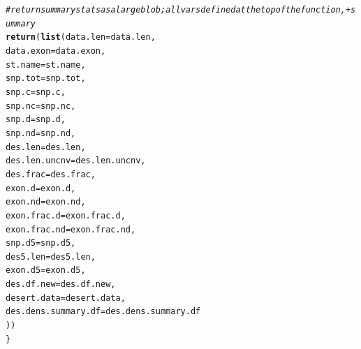 \documentclass{article}\usepackage[]{graphicx}\usepackage[]{color}
\makeatletter
\newcommand{\hlcom}[1]{\textcolor[rgb]{0.678,0.584,0.686}{\textit{#1}}}%
\newcommand{\hlstd}[1]{\textcolor[rgb]{0.345,0.345,0.345}{#1}}%
\newcommand{\hlkwc}[1]{\textcolor[rgb]{0.333,0.667,0.333}{#1}}%
\newcommand{\hlkwd}[1]{\textcolor[rgb]{0.737,0.353,0.396}{\textbf{#1}}}%
\newenvironment{kframe}{%
 \def\at@end@of@kframe{}%
 \ifinner\ifhmode%
  \def\at@end@of@kframe{\end{minipage}}%
  \begin{minipage}{\columnwidth}%
 \fi\fi%
 \def\FrameCommand##1{\hskip\@totalleftmargin \hskip-\fboxsep
 \colorbox{shadecolor}{##1}\hskip-\fboxsep
     \hskip-\linewidth \hskip-\@totalleftmargin \hskip\columnwidth}%
 \MakeFramed {\advance\hsize-\width
   \@totalleftmargin\z@ \linewidth\hsize
   \@setminipage}}%
 {\par\unskip\endMakeFramed%
 \at@end@of@kframe}
\newenvironment{knitrout}{}{} %
\makeatother
\begin{document}
\begin{knitrout}
\begin{kframe}
\begin{alltt}
  \hlcom{# return summary stats as a large blob;  all vars defined at the top of the function,  + summary}
  \hlkwd{return}\hlstd{(}\hlkwd{list}\hlstd{(}\hlkwc{data.len}\hlstd{=data.len,}
              \hlkwc{data.exon}\hlstd{=data.exon,}
              \hlkwc{st.name}\hlstd{=st.name,}
              \hlkwc{snp.tot}\hlstd{=snp.tot,}
              \hlkwc{snp.c}\hlstd{=snp.c,}
              \hlkwc{snp.nc}\hlstd{=snp.nc,}
              \hlkwc{snp.d}\hlstd{=snp.d,}
              \hlkwc{snp.nd}\hlstd{=snp.nd,}
              \hlkwc{des.len}\hlstd{=des.len,}
              \hlkwc{des.len.uncnv}\hlstd{=des.len.uncnv,}
              \hlkwc{des.frac}\hlstd{=des.frac,}
              \hlkwc{exon.d}\hlstd{=exon.d,}
              \hlkwc{exon.nd}\hlstd{=exon.nd,}
              \hlkwc{exon.frac.d}\hlstd{=exon.frac.d,}
              \hlkwc{exon.frac.nd}\hlstd{=exon.frac.nd,}
              \hlkwc{snp.d5}\hlstd{=snp.d5,}
              \hlkwc{des5.len}\hlstd{=des5.len,}
              \hlkwc{exon.d5}\hlstd{=exon.d5,}
              \hlkwc{des.df.new}\hlstd{=des.df.new,}
              \hlkwc{desert.data}\hlstd{=desert.data,}
              \hlkwc{des.dens.summary.df}\hlstd{=des.dens.summary.df}
  \hlstd{))}
\hlstd{\}}
\end{alltt}
\end{kframe}
\end{knitrout}
\end{document}
